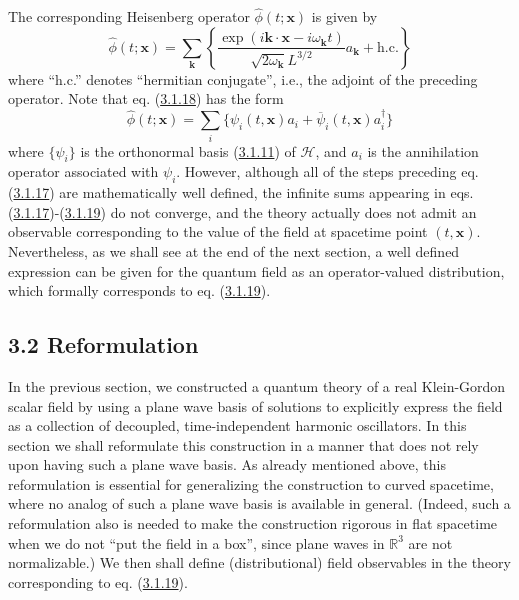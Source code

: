 \documentclass[11pt,a4paper]{article}
\begin{document}
The corresponding Heisenberg operator \(\hat{\phi}(t; \mathbf{x})\) is given by
\begin{equation*}
\hat\phi(t;\mathbf{x})=\sum_{\mathbf{k}}\left\{\frac{\exp(i\mathbf{k}\cdot\mathbf{x}-i\omega_{\mathbf{k}}t)}{\sqrt{2\omega_{\mathbf{k}}} L^{3/2}}a_{\mathbf{k}}+\mathrm{h.c.}\right\} \tag{3.1.18}\label{eq:3.1.18}
\end{equation*}
where ``h.c.'' denotes ``hermitian conjugate'', i.e., the adjoint of the preceding operator. Note that eq. (\hyperref[eq:3.1.18]{3.1.18}) has the form
\begin{equation*}
\widehat{\phi}(t; \mathbf{x}) = \sum_{i} \{ \psi_{i}(t, \mathbf{x}) a_{i} + \overline{\psi}_{i}(t, \mathbf{x}) a_{i}^{\dagger} \} \tag{3.1.19}\label{eq:3.1.19}
\end{equation*}
where \(\{\psi_i\}\) is the orthonormal basis (\hyperref[eq:3.1.11]{3.1.11}) of \(\mathcal{H}\), and \(a_i\) is the annihilation operator associated with \(\psi_i\). However, although all of the steps preceding eq. (\hyperref[eq:3.1.17]{3.1.17}) are mathematically well defined, the infinite sums appearing in eqs. (\hyperref[eq:3.1.17]{3.1.17})-(\hyperref[eq:3.1.19]{3.1.19}) do not converge, and the theory actually does not admit an observable corresponding to the value of the field at spacetime point \((t, \mathbf{x})\). Nevertheless, as we shall see at the end of the next section, a well defined expression can be given for the quantum field as an operator-valued distribution, which formally corresponds to eq. (\hyperref[eq:3.1.19]{3.1.19}).

\subsection*{3.2 Reformulation}\hypertarget{sec:3.2}{}

In the previous section, we constructed a quantum theory of a real Klein-Gordon scalar field by using a plane wave basis of solutions to explicitly express the field as a collection of decoupled, \hypertarget{source-49}{} time-independent harmonic oscillators. In this section we shall reformulate this construction in a manner that does not rely upon having such a plane wave basis. As already mentioned above, this reformulation is essential for generalizing the construction to curved spacetime, where no analog of such a plane wave basis is available in general. (Indeed, such a reformulation also is needed to make the construction rigorous in flat spacetime when we do not ``put the field in a box'', since plane waves in \(\mathbb{R}^3\) are not normalizable.) We then shall define (distributional) field observables in the theory corresponding to eq. (\hyperref[eq:3.1.19]{3.1.19}).
\end{document}
